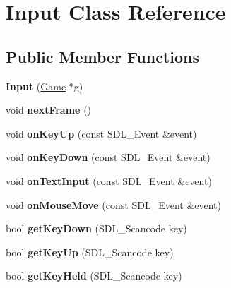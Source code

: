 \hypertarget{class_input}{}\section{Input Class Reference}
\label{class_input}
\subsection*{Public Member Functions}
\begin{DoxyCompactItemize}
\item 
\hypertarget{class_input_a70f98f66cf753329e4dd186ead94c5dd}{}\label{class_input_a70f98f66cf753329e4dd186ead94c5dd} 
{\bfseries Input} (\hyperlink{class_game}{Game} $\ast$g)
\item 
\hypertarget{class_input_aa46ab29d639305a50c89b0d66fcf55c0}{}\label{class_input_aa46ab29d639305a50c89b0d66fcf55c0} 
void {\bfseries next\+Frame} ()
\item 
\hypertarget{class_input_a202c90089d8350f986624f61cc2d6ea6}{}\label{class_input_a202c90089d8350f986624f61cc2d6ea6} 
void {\bfseries on\+Key\+Up} (const S\+D\+L\+\_\+\+Event \&event)
\item 
\hypertarget{class_input_a59c7caa1d59d225dd0f133fdf40aa482}{}\label{class_input_a59c7caa1d59d225dd0f133fdf40aa482} 
void {\bfseries on\+Key\+Down} (const S\+D\+L\+\_\+\+Event \&event)
\item 
\hypertarget{class_input_a4ccdb481487fad67594420ba8b571b53}{}\label{class_input_a4ccdb481487fad67594420ba8b571b53} 
void {\bfseries on\+Text\+Input} (const S\+D\+L\+\_\+\+Event \&event)
\item 
\hypertarget{class_input_a666e0755d6171555cbf510c4e00ff3b9}{}\label{class_input_a666e0755d6171555cbf510c4e00ff3b9} 
void {\bfseries on\+Mouse\+Move} (const S\+D\+L\+\_\+\+Event \&event)
\item 
\hypertarget{class_input_a5ce8fcc6acc185f768b8844f2bf6c99b}{}\label{class_input_a5ce8fcc6acc185f768b8844f2bf6c99b} 
bool {\bfseries get\+Key\+Down} (S\+D\+L\+\_\+\+Scancode key)
\item 
\hypertarget{class_input_abb4f8f37da21343ff55016546e2fa061}{}\label{class_input_abb4f8f37da21343ff55016546e2fa061} 
bool {\bfseries get\+Key\+Up} (S\+D\+L\+\_\+\+Scancode key)
\item 
\hypertarget{class_input_aaf99a4b921370afc4358e1dc625570e1}{}\label{class_input_aaf99a4b921370afc4358e1dc625570e1} 
bool {\bfseries get\+Key\+Held} (S\+D\+L\+\_\+\+Scancode key)
\item 
\hypertarget{class_input_ab8cf7447a4cc4f1947fb87d9ac71fd97}{}\label{class_input_ab8cf7447a4cc4f1947fb87d9ac71fd97} 

\end{DoxyCompactItemize}
